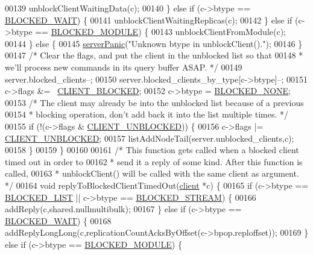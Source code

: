 \begin{DoxyCode}
00139         unblockClientWaitingData(c);
00140     \} \textcolor{keywordflow}{else} \textcolor{keywordflow}{if} (c->btype == \hyperlink{server_8h_accb912da92773eadb0b938af3fa95c63}{BLOCKED\_WAIT}) \{
00141         unblockClientWaitingReplicas(c);
00142     \} \textcolor{keywordflow}{else} \textcolor{keywordflow}{if} (c->btype == \hyperlink{server_8h_a6bdaa78b1c4c376ebf666afb891ace42}{BLOCKED\_MODULE}) \{
00143         unblockClientFromModule(c);
00144     \} \textcolor{keywordflow}{else} \{
00145         \hyperlink{server_8h_a11cc378e7778a830b41240578de3b204}{serverPanic}(\textcolor{stringliteral}{"Unknown btype in unblockClient()."});
00146     \}
00147     \textcolor{comment}{/* Clear the flags, and put the client in the unblocked list so that}
00148 \textcolor{comment}{     * we'll process new commands in its query buffer ASAP. */}
00149     server.blocked\_clients--;
00150     server.blocked\_clients\_by\_type[c->btype]--;
00151     c->flags &= ~\hyperlink{server_8h_a503ad979164a52f0f5e2a63e4c7da3a0}{CLIENT\_BLOCKED};
00152     c->btype = \hyperlink{server_8h_a89cf259b265c26cd1e09de67ade457dc}{BLOCKED\_NONE};
00153     \textcolor{comment}{/* The client may already be into the unblocked list because of a previous}
00154 \textcolor{comment}{     * blocking operation, don't add back it into the list multiple times. */}
00155     \textcolor{keywordflow}{if} (!(c->flags & \hyperlink{server_8h_a1252372d6834686c29e958d9d96367a8}{CLIENT\_UNBLOCKED})) \{
00156         c->flags |= \hyperlink{server_8h_a1252372d6834686c29e958d9d96367a8}{CLIENT\_UNBLOCKED};
00157         listAddNodeTail(server.unblocked\_clients,c);
00158     \}
00159 \}
00160 
00161 \textcolor{comment}{/* This function gets called when a blocked client timed out in order to}
00162 \textcolor{comment}{ * send it a reply of some kind. After this function is called,}
00163 \textcolor{comment}{ * unblockClient() will be called with the same client as argument. */}
00164 \textcolor{keywordtype}{void} replyToBlockedClientTimedOut(\hyperlink{structclient}{client} *c) \{
00165     \textcolor{keywordflow}{if} (c->btype == \hyperlink{server_8h_a279f6a31729ba24d6dab0944b82e0b55}{BLOCKED\_LIST} || c->btype == \hyperlink{server_8h_a1f48bb63f9d0c061421044b92b46f679}{BLOCKED\_STREAM}) \{
00166         addReply(c,shared.nullmultibulk);
00167     \} \textcolor{keywordflow}{else} \textcolor{keywordflow}{if} (c->btype == \hyperlink{server_8h_accb912da92773eadb0b938af3fa95c63}{BLOCKED\_WAIT}) \{
00168         addReplyLongLong(c,replicationCountAcksByOffset(c->bpop.reploffset));
00169     \} \textcolor{keywordflow}{else} \textcolor{keywordflow}{if} (c->btype == \hyperlink{server_8h_a6bdaa78b1c4c376ebf666afb891ace42}{BLOCKED\_MODULE}) \{

\end{DoxyCode}
